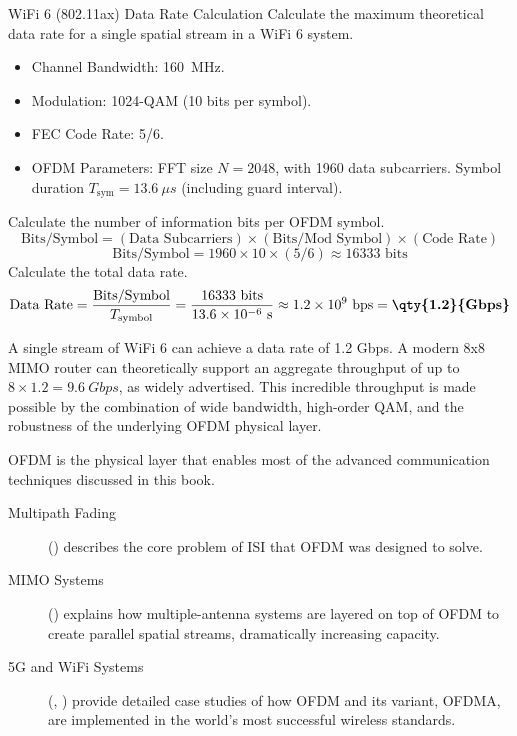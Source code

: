 \begin{workedexample}{WiFi 6 (802.11ax) Data Rate Calculation}
     Calculate the maximum theoretical data rate for a single spatial stream in a WiFi 6 system.
    \begin{itemize}
        \item Channel Bandwidth: \qty{160}{MHz}.
        \item Modulation: 1024-QAM (10 bits per symbol).
        \item FEC Code Rate: 5/6.
        \item OFDM Parameters: FFT size $N=2048$, with 1960 data subcarriers. Symbol duration $T_{\text{sym}} = \qty{13.6}{\mu s}$ (including guard interval).
    \end{itemize}
    \begin{derivationsteps}
        \step Calculate the number of information bits per OFDM symbol.
        \[ \text{Bits/Symbol} = (\text{Data Subcarriers}) \times (\text{Bits/Mod Symbol}) \times (\text{Code Rate}) \]
        \[ \text{Bits/Symbol} = 1960 \times 10 \times (5/6) \approx 16333 \text{ bits} \]
        \step Calculate the total data rate.
        \[ \text{Data Rate} = \frac{\text{Bits/Symbol}}{T_{\text{symbol}}} = \frac{16333 \text{ bits}}{13.6 \times 10^{-6} \text{ s}} \approx 1.2 \times 10^9 \text{ bps} = \textbf{\qty{1.2}{Gbps}} \]
    \end{derivationsteps}
     A single stream of WiFi 6 can achieve a data rate of 1.2 Gbps. A modern 8x8 MIMO router can theoretically support an aggregate throughput of up to $8 \times 1.2 = \qty{9.6}{Gbps}$, as widely advertised. This incredible throughput is made possible by the combination of wide bandwidth, high-order QAM, and the robustness of the underlying OFDM physical layer.
\end{workedexample}


\begin{importantbox}[title={Further Reading}]
    OFDM is the physical layer that enables most of the advanced communication techniques discussed in this book.
    \begin{description}
        \item[Multipath Fading] () describes the core problem of ISI that OFDM was designed to solve.
        \item[MIMO Systems] () explains how multiple-antenna systems are layered on top of OFDM to create parallel spatial streams, dramatically increasing capacity.
        \item[5G and WiFi Systems] (, ) provide detailed case studies of how OFDM and its variant, OFDMA, are implemented in the world's most successful wireless standards.
    \end{description}
\end{importantbox}
